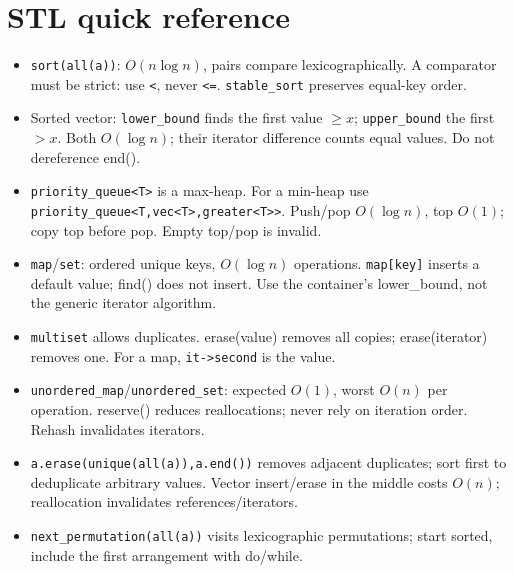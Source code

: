 \section{STL quick reference}
\begin{itemize}[nosep,leftmargin=*]
\item \texttt{sort(all(a))}: $O(n\log n)$, pairs compare lexicographically.
A comparator must be strict: use \texttt{<}, never \texttt{<=}.
\texttt{stable\_sort} preserves equal-key order.
\item Sorted vector: \texttt{lower\_bound} finds the first value $\ge x$;
\texttt{upper\_bound} the first $>x$. Both $O(\log n)$;
their iterator difference counts equal values. Do not dereference end().
\item \texttt{priority\_queue<T>} is a max-heap. For a min-heap use
\texttt{priority\_queue<T,vec<T>,greater<T>>}. Push/pop $O(\log n)$,
top $O(1)$; copy top before pop. Empty top/pop is invalid.
\item \texttt{map}/\texttt{set}: ordered unique keys, $O(\log n)$ operations.
\texttt{map[key]} inserts a default value; find() does not insert.
Use the container's lower\_bound, not the generic iterator algorithm.
\item \texttt{multiset} allows duplicates. erase(value) removes all copies;
erase(iterator) removes one. For a map, \texttt{it->second} is the value.
\item \texttt{unordered\_map}/\texttt{unordered\_set}: expected $O(1)$,
worst $O(n)$ per operation. reserve() reduces reallocations;
never rely on iteration order. Rehash invalidates iterators.
\item \texttt{a.erase(unique(all(a)),a.end())} removes adjacent duplicates;
sort first to deduplicate arbitrary values. Vector insert/erase in the
middle costs $O(n)$; reallocation invalidates references/iterators.
\item \texttt{next\_permutation(all(a))} visits lexicographic permutations;
start sorted, include the first arrangement with do/while.
\end{itemize}
